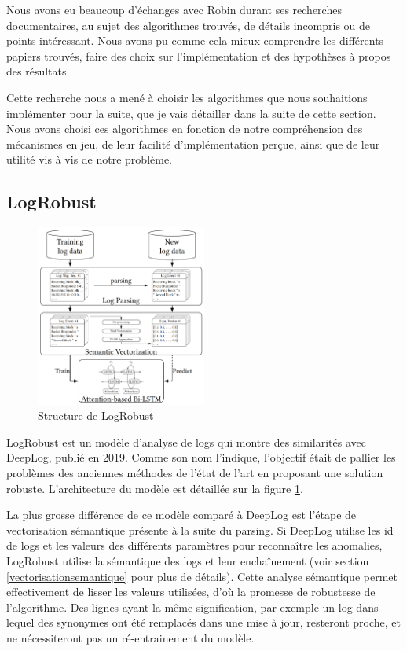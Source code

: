 \documentclass[openany, 11pt]{memoir}
\begin{document}
Nous avons eu beaucoup d'échanges avec Robin durant ses recherches documentaires, au sujet des algorithmes trouvés, de détails incompris ou de points intéressant. Nous avons pu comme cela mieux comprendre les différents papiers trouvés, faire des choix sur l'implémentation et des hypothèses à propos des résultats.

\bigskip
Cette recherche nous a mené à choisir les algorithmes que nous souhaitions implémenter pour la suite, que je vais détailler dans la suite de cette section. Nous avons choisi ces algorithmes en fonction de notre compréhension des mécanismes en jeu, de leur facilité d'implémentation perçue, ainsi que de leur utilité vis à vis de notre problème.

\subsection{LogRobust}

\begin{figure}[ht]
	\centering
	\includegraphics[width=0.5\textwidth]{images/logrobust.png}
	\caption{Structure de LogRobust}
	\label{logrobust}
\end{figure}

LogRobust \cite{logrobust} est un modèle d'analyse de \glspl{log} qui montre des similarités avec DeepLog, publié en 2019. Comme son nom l'indique, l'objectif était de pallier les problèmes des anciennes méthodes de l'état de l'art en proposant une solution robuste. L'architecture du modèle est détaillée sur la figure \ref{logrobust}.

\bigskip
La plus grosse différence de ce modèle comparé à DeepLog est l'étape de vectorisation sémantique présente à la suite du parsing. Si DeepLog utilise les id de \glspl{log} et les valeurs des différents paramètres pour reconnaître les anomalies, LogRobust utilise la sémantique des logs et leur enchaînement (voir section \ref{vectorisationsemantique} pour plus de détails). Cette analyse sémantique permet effectivement de lisser les valeurs utilisées, d'où la promesse de robustesse de l'algorithme. Des lignes ayant la même signification, par exemple un log dans lequel des synonymes ont été remplacés dans une mise à jour, resteront proche, et ne nécessiteront pas un ré-entrainement du modèle.
\end{document}
